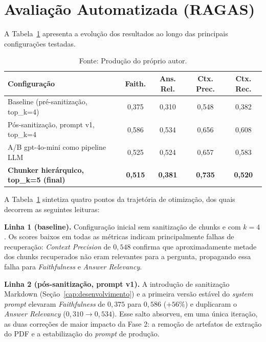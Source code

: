 \documentclass[
  12pt,
  oneside,
  a4paper,
  english,
  brazil
]{abntex2}
\begin{document}
\section{Avaliação Automatizada (RAGAS)}

A Tabela~\ref{tab:ragas} apresenta a evolução dos resultados ao longo das principais
configurações testadas.

\begin{table}[ht]
  \caption{Evolução dos resultados RAGAS do chatbot ILTB (marcos de
           desenvolvimento; uma corrida por linha, sem replicação multi-seed
           --- ver Limitação L7)}
  \label{tab:ragas}
  \begin{tabularx}{\textwidth}{@{}Xcccc@{}}
  \toprule
  \textbf{Configuração} &
  \textbf{Faith.} &
  \textbf{Ans. Rel.} &
  \textbf{Ctx. Prec.} &
  \textbf{Ctx. Rec.} \\
  \midrule
  Baseline (pré-sanitização, top\_k=4) & 0{,}375 & 0{,}310 & 0{,}548 & 0{,}382 \\
  Pós-sanitização, prompt v1, top\_k=4 & 0{,}586 & 0{,}534 & 0{,}656 & 0{,}608 \\
  A/B gpt-4o-mini como pipeline LLM     & 0{,}525 & 0{,}524 & 0{,}657 & 0{,}583 \\
  \textbf{Chunker hierárquico, top\_k=5 (final)} &
    \textbf{0{,}515} & \textbf{0{,}381} & \textbf{0{,}735} & \textbf{0{,}520} \\
  \bottomrule
  \end{tabularx}
  \caption*{Fonte: Produção do próprio autor.}
\end{table}

A Tabela~\ref{tab:ragas} sintetiza quatro pontos da trajetória de otimização, dos
quais decorrem as seguintes leituras:

\textbf{Linha 1 (baseline).} Configuração inicial sem sanitização de
chunks e com $k=4$. Os scores baixos em todas as métricas
indicam principalmente falhas de recuperação: \textit{Context Precision} de
$0{,}548$ confirma que aproximadamente metade dos chunks recuperados
não eram relevantes para a pergunta, propagando essa falha para
\textit{Faithfulness} e \textit{Answer Relevancy}.

\textbf{Linha 2 (pós-sanitização, prompt v1).} A introdução de
sanitização Markdown (Seção~\ref{cap:desenvolvimento}) e a primeira versão
estável do \textit{system prompt} elevaram \textit{Faithfulness} de
$0{,}375$ para $0{,}586$ ($+56\%$) e duplicaram o \textit{Answer Relevancy}
($0{,}310 \to 0{,}534$). Esse salto absorveu, em uma única iteração, as
duas correções de maior impacto da Fase 2: a remoção de artefatos de
extração do PDF e a estabilização do \textit{prompt} de produção.
\end{document}
